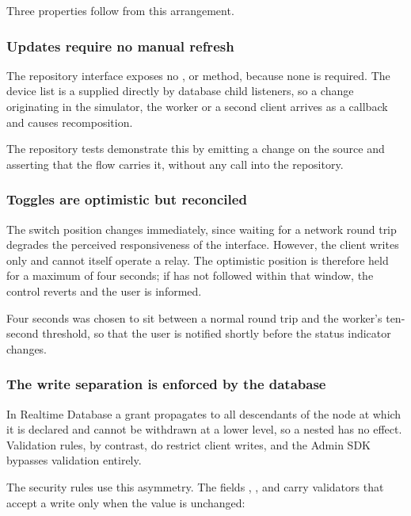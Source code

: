 \documentclass[11pt,a4paper]{article}
\begin{document}
Three properties follow from this arrangement.

\subsubsection{Updates require no manual refresh}

The repository interface exposes no ,  or
 method, because none is required. The device list is a
 supplied directly by database child listeners, so a change
originating in the simulator, the worker or a second client arrives as a
callback and causes recomposition.

The repository tests demonstrate this by emitting a change on the source and
asserting that the flow carries it, without any call into the repository.

\subsubsection{Toggles are optimistic but reconciled}

The switch position changes immediately, since waiting for a network round trip
degrades the perceived responsiveness of the interface. However, the client
writes only  and cannot itself operate a relay. The
optimistic position is therefore held for a maximum of four seconds; if
 has not followed within that window, the control reverts
and the user is informed.

Four seconds was chosen to sit between a normal round trip and the worker's
ten-second  threshold, so that the user is notified shortly before
the status indicator changes.

\subsubsection{The write separation is enforced by the database}

In Realtime Database a  grant propagates to all descendants of the
node at which it is declared and cannot be withdrawn at a lower level, so a
nested  has no effect. Validation rules, by contrast, do
restrict client writes, and the Admin SDK bypasses validation entirely.

The security rules use this asymmetry. The fields , ,
 and  carry validators that accept a write
only when the value is unchanged:
\end{document}

